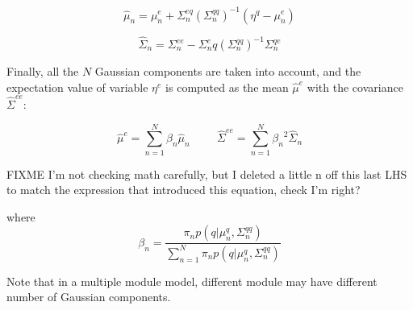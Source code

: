 \begin{table}
{\begin{minipage}[t]{0.45\textwidth}
            \begin{equation}
            {
            \hat{\mu}_{n} = {\mu}_{n}^e + \Sigma_{n}^{eq}({\Sigma}_{n}^{qq})^{-1}(\eta^q-{\mu}_{n}^e)
            }
            \end{equation}

            \begin{equation}
            {
            \hat{\Sigma}_{n} = {\Sigma}_{n}^{ee} - {\Sigma}_{n}^eq({\Sigma}_{n}^{qq})^{-1}{\Sigma}_{n}^{qe}
            }
            \end{equation}


            Finally, all the $N$ Gaussian components are taken into
            account, and the expectation value of variable $\eta^e$ is
            computed as the mean $\hat{\mu}^e$ with the covariance
            $\hat{\Sigma}^{ee}$: 

            \begin{equation}
            {
            \hat{\mu}^{e} = \sum_{n=1}^N{\beta_n}\hat{\mu}_{n}
            }
            \hspace{1cm}
            {
            \hat{\Sigma}^{ee} = \sum_{n=1}^N{\beta_n}^2\hat{\Sigma}_{n}
            }
            \end{equation}

FIXME I'm not checking math
            carefully, but I deleted a little n off this last LHS to
            match the expression that introduced this equation, check
            I'm right?  %

            where
            \begin{equation}
            {
            \beta_n = \frac{\pi_{n}p(q|{\mu}_{n}^q,{\Sigma}_{n}^{qq})}
            {\sum_{n=1}^N{\pi_n}p(q|{\mu}_{n}^q,{\Sigma}_{n}^{qq})}
            }
            \end{equation}

            Note that in a multiple module model, different module may have different number of Gaussian components.
        \end{minipage}
    }
\caption{Encoding process of GMM and computation process of GMR}
\label{tab:GMM}
\end{table}



